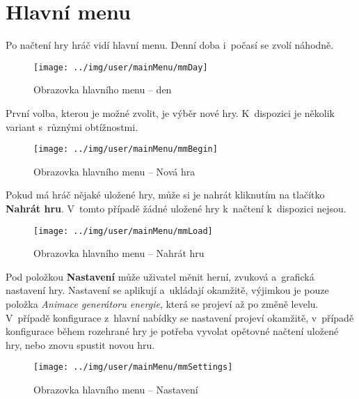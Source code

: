 
\section{Hlavní menu}

Po načtení hry hráč vidí hlavní menu. Denní doba i~počasí se zvolí náhodně.

\begin{figure}[!ht]\centering
\texttt{[image: ../img/user/mainMenu/mmDay]}

\caption{Obrazovka hlavního menu -- den}
\label{fig:user_mainMenu_mmDay}

\end{figure}


\FloatBarrier

První volba, kterou je možné zvolit, je výběr nové hry. K~dispozici je několik variant s~různými obtížnostmi.

\begin{figure}[!ht]\centering
\texttt{[image: ../img/user/mainMenu/mmBegin]}

\caption{Obrazovka hlavního menu -- Nová hra}
\label{fig:user_mainMenu_mmBegin}

\end{figure}
\FloatBarrier

Pokud má hráč nějaké uložené hry, může si je nahrát kliknutím na tlačítko \textbf{Nahrát hru}. V~tomto případě žádné uložené hry k~načtení k~dispozici nejsou.

\begin{figure}[!ht]\centering
\texttt{[image: ../img/user/mainMenu/mmLoad]}

\caption{Obrazovka hlavního menu -- Nahrát hru}
\label{fig:user_mainMenu_mmLoad}

\end{figure}
\FloatBarrier

Pod položkou \textbf{Nastavení} může uživatel měnit herní, zvuková a~grafická nastavení hry. Nastavení se aplikují a~ukládají okamžitě, výjimkou je pouze položka \textit{Animace generátoru energie}, která se projeví až po změně levelu. V~případě konfigurace z~hlavní nabídky se nastavení projeví okamžitě, v~případě konfigurace během rozehrané hry je potřeba vyvolat opětovné načtení uložené hry, nebo znovu spustit novou hru.

\begin{figure}[!ht]\centering
\texttt{[image: ../img/user/mainMenu/mmSettings]}

\caption{Obrazovka hlavního menu -- Nastavení}
\label{fig:user_mainMenu_mmSettings}

\end{figure}

\FloatBarrier
